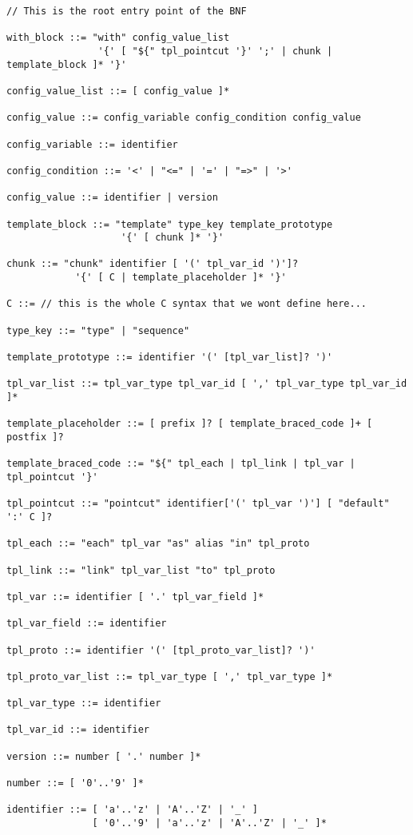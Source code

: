 \documentclass[french]{rtxreport}
\begin{document}
\lstset{}
\begin{lstlisting}
// This is the root entry point of the BNF

with_block ::= "with" config_value_list
                '{' [ "${" tpl_pointcut '}' ';' | chunk | template_block ]* '}'

config_value_list ::= [ config_value ]*

config_value ::= config_variable config_condition config_value

config_variable ::= identifier

config_condition ::= '<' | "<=" | '=' | "=>" | '>'

config_value ::= identifier | version

template_block ::= "template" type_key template_prototype
                    '{' [ chunk ]* '}'

chunk ::= "chunk" identifier [ '(' tpl_var_id ')']?
            '{' [ C | template_placeholder ]* '}'

C ::= // this is the whole C syntax that we wont define here...

type_key ::= "type" | "sequence"

template_prototype ::= identifier '(' [tpl_var_list]? ')'

tpl_var_list ::= tpl_var_type tpl_var_id [ ',' tpl_var_type tpl_var_id ]*

template_placeholder ::= [ prefix ]? [ template_braced_code ]+ [ postfix ]?

template_braced_code ::= "${" tpl_each | tpl_link | tpl_var | tpl_pointcut '}'

tpl_pointcut ::= "pointcut" identifier['(' tpl_var ')'] [ "default" ':' C ]?

tpl_each ::= "each" tpl_var "as" alias "in" tpl_proto

tpl_link ::= "link" tpl_var_list "to" tpl_proto

tpl_var ::= identifier [ '.' tpl_var_field ]*

tpl_var_field ::= identifier

tpl_proto ::= identifier '(' [tpl_proto_var_list]? ')'

tpl_proto_var_list ::= tpl_var_type [ ',' tpl_var_type ]*

tpl_var_type ::= identifier

tpl_var_id ::= identifier

version ::= number [ '.' number ]*

number ::= [ '0'..'9' ]*

identifier ::= [ 'a'..'z' | 'A'..'Z' | '_' ]
               [ '0'..'9' | 'a'..'z' | 'A'..'Z' | '_' ]*

\end{lstlisting}
\end{document}
